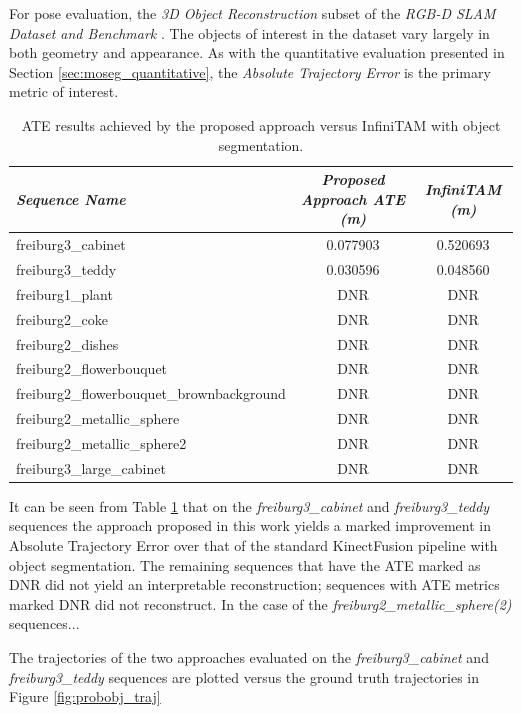 For pose evaluation, the \textit{3D Object Reconstruction} subset of the 
\textit{RGB-D SLAM Dataset and Benchmark} \cite{Sturm2012}. The objects of interest in 
the dataset vary largely in both geometry and appearance. As with the quantitative 
evaluation presented in Section \ref{sec:moseg_quantitative}, the 
\textit{Absolute Trajectory Error} is the primary metric of interest.

\begin{table}[h]
  \label{tbl:probobj_ate}
  \centering
  \begin{tabular}{l@{\hskip 1cm} c c}
    \emph{Sequence Name} & \emph{Proposed Approach ATE (m)} & \emph{InfiniTAM (m)}\\
    \midrule
    \textsf{freiburg3\_cabinet} & 0.077903 & 0.520693\\
    \textsf{freiburg3\_teddy}   & 0.030596 & 0.048560 \\
    \textsf{freiburg1\_plant}   & DNR & DNR \\
    \textsf{freiburg2\_coke}   & DNR & DNR \\
    \textsf{freiburg2\_dishes}   & DNR & DNR \\
    \textsf{freiburg2\_flowerbouquet}   & DNR & DNR \\
    \textsf{freiburg2\_flowerbouquet\_brownbackground}   & DNR & DNR \\
    \textsf{freiburg2\_metallic\_sphere}   & DNR & DNR \\
    \textsf{freiburg2\_metallic\_sphere2}   & DNR & DNR \\
    \textsf{freiburg3\_large\_cabinet}   & DNR & DNR
  \end{tabular}
  \caption[Probabilistic Object Reconstruction ATE]
  {ATE results achieved by the proposed approach versus InfiniTAM with object segmentation.}
\end{table}

It can be seen from Table \ref{tbl:probobj_ate} that on the \textit{freiburg3\_cabinet} 
and \textit{\textsf{freiburg3\_teddy}} sequences the approach proposed in this work 
yields a marked improvement in Absolute Trajectory Error over that of the standard KinectFusion 
pipeline with object segmentation. The remaining sequences that have the ATE marked as DNR did 
not yield an interpretable reconstruction; sequences with ATE metrics marked DNR did not 
reconstruct. In the case of the \textit{freiburg2\_metallic\_sphere(2)} sequences...

The trajectories of the two approaches evaluated on the \textit{freiburg3\_cabinet} 
and \textit{\textsf{freiburg3\_teddy}} sequences are plotted versus the ground truth trajectories 
in Figure \ref{fig:probobj_traj}

